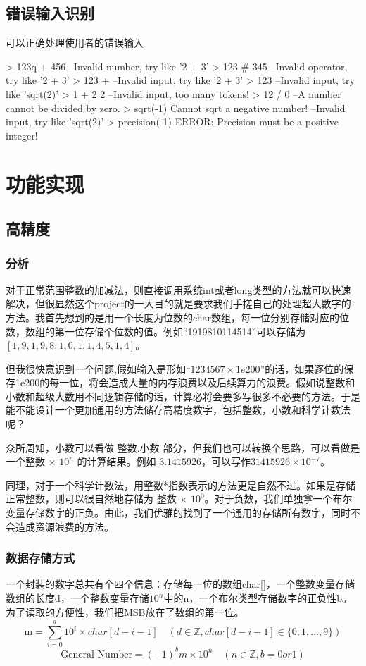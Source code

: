 \documentclass[11pt]{article}
\begin{document}
\subsection{错误输入识别}
可以正确处理使用者的错误输入
\begin{commandline}
> 123q + 456
 --Invalid number, try like '2 + 3'
> 123 # 345
 --Invalid operator, try like '2 + 3'
> 123 +    
 --Invalid input, try like '2 + 3'
> 123  
 --Invalid input, try like 'sqrt(2)'
> 1 + 2 2
 --Invalid input, too many tokens!
> 12 / 0
 --A number cannot be divided by zero.
> sqrt(-1)
 Cannot sqrt a negative number!
 --Invalid input, try like 'sqrt(2)'
> precision(-1)
ERROR: Precision must be a positive integer!
\end{commandline}

\section{功能实现}

\subsection{高精度}

\subsubsection{分析}
对于正常范围整数的加减法，则直接调用系统int或者long类型的方法就可以快速解决，但很显然这个project的一大目的就是要求我们手搓自己的处理超大数字的方法。我首先想到的是用一个长度为位数的char数组，每一位分别存储对应的位数，数组的第一位存储个位数的值。例如“1919810114514”可以存储为$[1,9,1,9,8,1,0,1,1,4,5,1,4]$。


但我很快意识到一个问题,假如输入是形如“$1234567 \times 1e200$”的话，如果逐位的保存1e200的每一位，将会造成大量的内存浪费以及后续算力的浪费。假如说整数和小数和超级大数用不同逻辑存储的话，计算必将会要多写很多不必要的方法。于是能不能设计一个更加通用的方法储存高精度数字，包括整数，小数和科学计数法呢？


众所周知，小数可以看做 整数.小数 部分，但我们也可以转换个思路，可以看做是一个整数 × $10^{n}$ 的计算结果。例如 $3.1415926$，可以写作$31415926 \times 10^{-7}$。


同理，对于一个科学计数法，用整数*指数表示的方法更是自然不过。如果是存储正常整数，则可以很自然地存储为 整数 × $10^{0}$。对于负数，我们单独拿一个布尔变量存储数字的正负。由此，我们优雅的找到了一个通用的存储所有数字，同时不会造成资源浪费的方法。

\subsubsection{数据存储方式}
一个封装的数字总共有个四个信息：存储每一位的数组char[]，一个整数变量存储数组的长度d，一个整数变量存储$10^n$中的n，一个布尔类型存储数字的正负性b。为了读取的方便性，我们把MSB放在了数组的第一位。
$$
\text{m} = \sum_{i = 0}^{d} 10^i\times char[d-i-1] \quad (d \in \mathbb{Z},char[d-i-1]\in \{0,1,\dots,9\})
$$
$$
\text{General-Number} = (-1)^b m \times 10^{n} \quad (n \in \mathbb{Z},b=0 or 1)
$$
\end{document}
